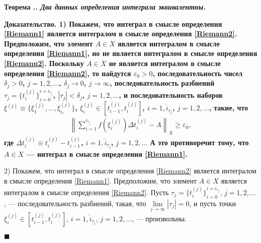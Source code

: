 \documentclass{report}
\newcounter{rem}[section]
\newcounter{theor}[section]
\renewcommand{\thetheor}{\thesection.\arabic{theor}}
\newenvironment{Theorem}{\par\refstepcounter{theor}\bf Теорема \thetheor. \it}{\rm\par}
\newenvironment{Proof}{\par\noindent\bf Доказательство.\rm}{ $\blacksquare$\par}
\begin{document}
\begin{Theorem}
Два данных определения интеграла эквивалентны.
\end{Theorem}
\begin{Proof}
1) Покажем, что интеграл в смысле определения \ref{Riemann1} является интегралом в смысле определения \ref{Riemann2}. Предположим, что элемент $A\in X$ является интегралом в смысле
определения \ref{Riemann1}, но не является интегралом в смысле определения \ref{Riemann2}. Поскольку $A\in X$ не является интегралом в смысле определения \ref{Riemann2}, то найдутся
$\varepsilon_0>0$, последовательность чисел $\delta_j>0$, $j=1,2,\dots$, $\delta_j\to0$, $j\to\infty$, последовательность разбиений $\tau_j=\{t_i^{(j)}\}^{i=i_{\tau_j}}_{i=0}$,
$|\tau_j|<\delta_j$, $j=1,2,\dots$, и последовательность наборов $\xi^{(j)}\equiv\{\xi^{(j)}_1,\dots, \xi^{(j)}_{i_\tau}\}$, $\xi^{(j)}_i\in[t^{(j)}_{i-1},t^{(j)}_i]$,
$i=\overline{1,i_{\tau_j}}$, $j=1,2,\dots$, такие, что
\begin{gather*}
\left\|\sum\limits_{i=1}^{i_{\tau_j}}f(\xi^{(j)}_i)\Delta t^{(j)}_i-A\right\|_X\geqslant\varepsilon_0,
\end{gather*}
где $\Delta t^{(j)}_i\equiv t^{(j)}_i-t^{(j)}_{i-1}$, $i=\overline{1,i_{\tau_j}}$, $j=1,2,\dots$ А это противоречит тому, что $A\in X$ --- интеграл в смысле определения \ref{Riemann1}.

2) Покажем, что интеграл в смысле определения \ref{Riemann2} является интегралом в смысле определения \ref{Riemann1}. Предположим, что элемент $A\in X$ является интегралом в смысле
определения \ref{Riemann2}. Пусть $\tau_j=\{t_i^{(j)}\}^{i=i_{\tau_j}}_{i=0}$, $j=1,2,\dots$, --- последовательность разбиений, такая, что $\lim\limits_{j\to\infty}|\tau_j|=0$, и пусть
точки $\xi^{(j)}_i\in[t^{(j)}_{i-1},t^{(j)}_i]$, $i=\overline{1,i_{\tau_j}}$, $j=1,2,\dots$, --- произвольны.


\end{Proof}
\end{document}
